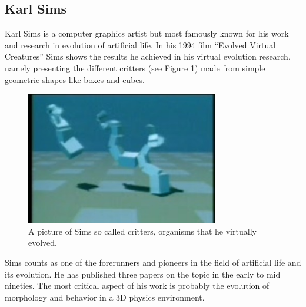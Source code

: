 \documentclass[12pt,oneside,listof=totoc,paper=a4,headings=small]{scrbook}
\begin{document}
\subsection{Karl Sims}
Karl Sims is a computer graphics artist but most famously known for his work and research in evolution of artificial life. In his 1994 film ``Evolved Virtual Creatures'' \cite{sims1994evolving} Sims shows the results he achieved in his virtual evolution research, namely presenting the different critters (see Figure \ref{fig:SimsCritters}) made from simple geometric shapes like boxes and cubes. 
\begin{figure}[h!]
\centering
\includegraphics[width=0.75\textwidth,height=0.75\textheight,keepaspectratio]{images/sims_evolved_virtual_creatures_1994&scale=2.jpeg}
\caption{A picture of Sims so called critters, organisms that he virtually evolved.~\cite{critterssims}}
\label{fig:SimsCritters}
\end{figure}

Sims counts as one of the forerunners and pioneers in the field of artificial life and its evolution. He has published three papers on the topic in the early to mid nineties. The most critical aspect of his work is probably the evolution of morphology and behavior in a 3D physics environment.
\end{document}
